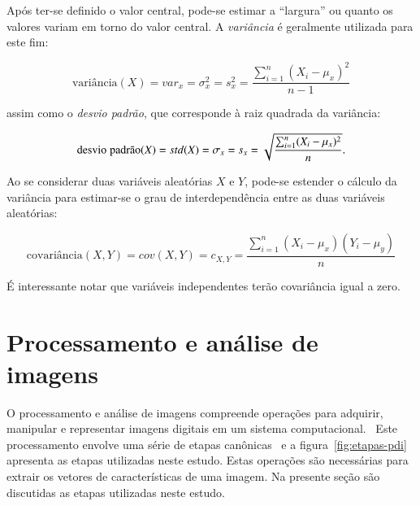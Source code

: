 Após ter-se definido o valor central, pode-se estimar a
``largura'' ou quanto os valores variam em torno do valor
central. A \textit{variância} é geralmente utilizada para este fim:

\begin{equation}
\text{variância}(X)=var_x=\sigma^2_x=s^2_x=\frac{\sum_{i=1}^{n}(X_i-\mu_x)^2}{n-1}
\end{equation}

\noindent assim como o \textit{desvio padrão}, que corresponde à raiz quadrada da variância:

\begin{equation}
\text{desvio\;padrão}(X)=std(X)=\sigma_x=s_x=\sqrt{\frac{\sum_{i=1}^{n}(X_i-\mu_x)^2}{n}}.
\end{equation}

Ao se considerar duas variáveis aleatórias $X$ e $Y$, pode-se estender
o cálculo da variância para estimar-se o grau de interdependência
entre as duas variáveis aleatórias:

\begin{equation}
\text{covariância}(X,Y)=cov(X,Y)=c_{X,Y}=\frac{\sum_{i=1}^{n}(X_i-\mu_x)(Y_i-\mu_y) }{n}
\end{equation}

É interessante notar que variáveis independentes terão covariância
igual a zero.

\section{Processamento e análise de imagens}
\label{sec:fund:imagens}

O processamento e análise de imagens compreende operações para
adquirir, manipular e representar imagens digitais em um sistema
computacional.~\cite{gonzalez} Este processamento envolve uma série de
etapas canônicas~\cite{luciano} e a figura~\ref{fig:etapas-pdi}
apresenta as etapas utilizadas neste estudo. Estas operações são
necessárias para extrair os vetores de características de uma
imagem. Na presente seção são discutidas as etapas utilizadas neste
estudo.

